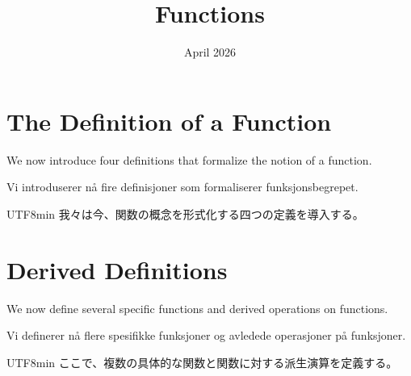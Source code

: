 \documentclass{axiom}
\title{Functions}
\author{}
\date{April 2026}
\begin{document}
\maketitle
{}

\begin{dependencies}
\end{dependencies}

\section{The Definition of a Function}
\noindent We now introduce four definitions that formalize the notion of a function.

\noindent Vi introduserer nå fire definisjoner som formaliserer funksjonsbegrepet.

\begin{CJK}{UTF8}{min}
\noindent 我々は今、関数の概念を形式化する四つの定義を導入する。
\end{CJK}

\begin{definition}[Function]\label{d:function}
\end{definition}

\begin{definition}[Domain]\label{d:domain}
\end{definition}

\begin{definition}\label{d:function-value}
\end{definition}

\begin{definition}\label{d:function-equality}
\end{definition}

\newpage
\section{Derived Definitions}
\noindent We now define several specific functions and derived operations on functions.

\noindent Vi definerer nå flere spesifikke funksjoner og avledede operasjoner på funksjoner.

\begin{CJK}{UTF8}{min}
\noindent ここで、複数の具体的な関数と関数に対する派生演算を定義する。
\end{CJK}
\end{document}

